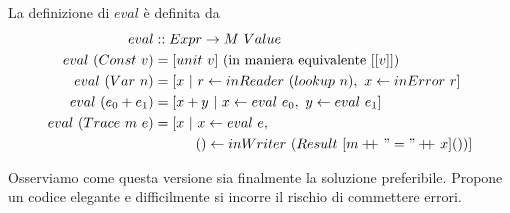 La definizione di $eval$ è definita da
\begin{align*}
  eval &:: Expr \to M\ Value\\
  eval\ (Const\ v) &= [unit\ v]\ (\text{in maniera equivalente}\ [[v]])\\
  eval\ (Var\ n) &= [x\ |\ r \leftarrow inReader\ (lookup\ n),\ x \leftarrow inError\ r]\\
  eval\ (e_0 + e_1) &= [x+y\ |\ x \leftarrow eval\ e_0,\ y \leftarrow eval\ e_1]\\
  eval\ (Trace\ m\ e) &= [x\ |\ x \leftarrow eval\ e,\\
                      &\qquad\quad () \leftarrow inWriter\ (Result\ [m \doubleplus "=" \doubleplus x] ())]
\end{align*}

Osserviamo come questa versione sia finalmente la soluzione preferibile.
Propone un codice elegante e difficilmente si incorre il rischio di commettere
errori.
